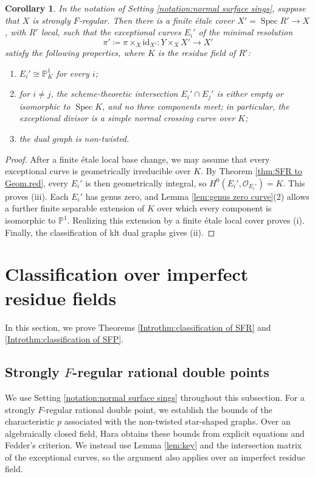 \documentclass[12pt]{amsart}
\def\Spec{\operatorname{Spec}}
\def\id{\mathrm{id}}
\newcommand{\PP}{\mathbb{P}}
\newcommand{\sO}{\mathcal{O}}
\theoremstyle{plain}
\newtheorem{cor}[thm]{Corollary}
\theoremstyle{definition}
\theoremstyle{remark}
\newtheorem{defn and notation}[thm]{Definition and Notation}
\theoremstyle{plain}
\numberwithin{equation}{thm}
\begin{document}
\begin{cor}\label{cor:minres=logres}
    In the notation of Setting \ref{notation:normal surface sings}, suppose that $X$ is strongly $F$-regular.
    Then there is a finite \'etale cover $X'=\Spec R'\to X$, with $R'$ local, such that the exceptional curves $E_i'$ of the minimal resolution
    \[
    \pi'\coloneqq\pi\times_X\id_{X'}\colon Y\times_X X'\to X'
    \]
    satisfy the following properties, where $K$ is the residue field of $R'$:
    \begin{enumerate}[label=\textup{(\roman*)}]
        \item $E_i'\cong\PP^1_K$ for every $i$;
        \item for $i\neq j$, the scheme-theoretic intersection $E_i'\cap E_j'$ is either empty or isomorphic to $\Spec K$, and no three components meet; in particular, the exceptional divisor is a simple normal crossing curve over $K$;
        \item the dual graph is non-twisted.
    \end{enumerate}
\end{cor}
\begin{proof}
    After a finite \'etale local base change, we may assume that every exceptional curve is geometrically irreducible over $K$.
    By Theorem \ref{thm:SFR to Geom.red}, every $E_i'$ is then geometrically integral, so $H^0(E_i',\sO_{E_i'})=K$.
    This proves (iii).
    Each $E_i'$ has genus zero, and Lemma \ref{lem:genus zero curve}(2) allows a further finite separable extension of $K$ over which every component is isomorphic to $\PP^1$.
    Realizing this extension by a finite \'etale local cover proves (i).
    Finally, the classification of klt dual graphs \cite[Figure 1]{Sato23} gives (ii).
\end{proof}



\section{Classification over imperfect residue fields}\label{section:Appendix}
In this section, we prove Theorems \ref{Introthm:classification of SFR} and \ref{Introthm:classification of SFP}.

\subsection{Strongly \texorpdfstring{$F$}{F}-regular rational double points}

We use Setting \ref{notation:normal surface sings} throughout this subsection.
For a strongly $F$-regular rational double point, we establish the bounds of the characteristic $p$ associated with the non-twisted star-shaped graphs.
Over an algebraically closed field, Hara obtains these bounds from explicit equations and Fedder's criterion.
We instead use Lemma \ref{lem:key} and the intersection matrix of the exceptional curves, so the argument also applies over an imperfect residue field.
\end{document}
